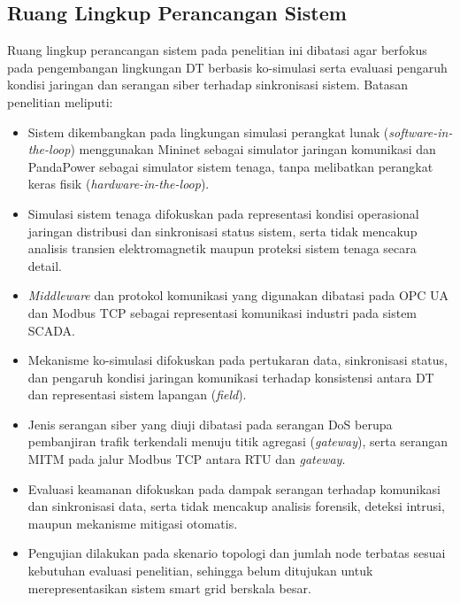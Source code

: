 \subsection{Ruang Lingkup Perancangan Sistem}
\label{subsec:ruang_lingkup_perancangan_sistem}
Ruang lingkup perancangan sistem pada penelitian ini dibatasi agar berfokus pada pengembangan lingkungan \ac{DT} berbasis ko-simulasi serta evaluasi pengaruh kondisi jaringan dan serangan siber terhadap sinkronisasi sistem. Batasan penelitian meliputi:

\begin{itemize}
    \item Sistem dikembangkan pada lingkungan simulasi perangkat lunak (\textit{software-in-the-loop}) menggunakan Mininet sebagai simulator jaringan komunikasi dan PandaPower sebagai simulator sistem tenaga, tanpa melibatkan perangkat keras fisik (\textit{hardware-in-the-loop}).

    \item Simulasi sistem tenaga difokuskan pada representasi kondisi operasional jaringan distribusi dan sinkronisasi status sistem, serta tidak mencakup analisis transien elektromagnetik maupun proteksi sistem tenaga secara detail.

    \item \textit{Middleware} dan protokol komunikasi yang digunakan dibatasi pada OPC UA dan Modbus TCP sebagai representasi komunikasi industri pada sistem SCADA.

    \item Mekanisme ko-simulasi difokuskan pada pertukaran data, sinkronisasi status, dan pengaruh kondisi jaringan komunikasi terhadap konsistensi antara \ac{DT} dan representasi sistem lapangan (\textit{field}).

    \item Jenis serangan siber yang diuji dibatasi pada serangan \ac{DoS} berupa pembanjiran trafik terkendali menuju titik agregasi (\textit{gateway}), serta serangan \ac{MITM} pada jalur Modbus TCP antara RTU dan \textit{gateway}.

    \item Evaluasi keamanan difokuskan pada dampak serangan terhadap komunikasi dan sinkronisasi data, serta tidak mencakup analisis forensik, deteksi intrusi, maupun mekanisme mitigasi otomatis.

    \item Pengujian dilakukan pada skenario topologi dan jumlah node terbatas sesuai kebutuhan evaluasi penelitian, sehingga belum ditujukan untuk merepresentasikan sistem smart grid berskala besar.
\end{itemize}
